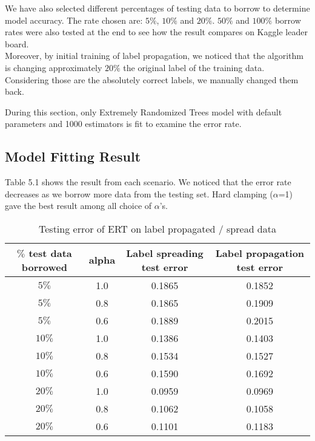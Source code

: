 \documentclass[11pt]{article}
\begin{document}
\noindent We have also selected different percentages of testing data to borrow to determine model accuracy. The rate chosen are: $5\%$, $10\%$ and $20\%$. $50\%$ and $100\%$ borrow rates were also tested at the end to see how the result compares on Kaggle leader board. \\

\noindent Moreover, by initial training of label propagation, we noticed that the algorithm is changing approximately $20\%$ the original label of the training data. Considering those are the absolutely correct labels, we manually changed them back.

\noindent During this section, only Extremely Randomized Trees model with default parameters and 1000 estimators is fit to examine the error rate. \\

\subsection{Model Fitting Result}

Table 5.1 shows the result from each scenario. We noticed that the error rate decreases as we borrow more data from the testing set. Hard clamping ($\alpha$=1) gave the best result among all choice of $\alpha$'s.

\begin{table}[ht]
    \label{semi_sub_result}
    \centering
    \begin{small}
    \begin{tabular}{c c|c|c}
        \hline
        \textbf{$\%$ test data borrowed} & \textbf{alpha} & \textbf{Label spreading test error} & \textbf{Label propagation test error} \\ \hline
        $5\%$ & 1.0 & 0.1865 & 0.1852 \\
        $5\%$ & 0.8 & 0.1865 & 0.1909 \\
        $5\%$ & 0.6 & 0.1889 & 0.2015 \\
        $10\%$ & 1.0 & 0.1386 & 0.1403 \\
        $10\%$ & 0.8 & 0.1534 & 0.1527 \\
        $10\%$ & 0.6 & 0.1590 & 0.1692 \\
        $20\%$ & 1.0 & 0.0959 & 0.0969 \\
        $20\%$ & 0.8 & 0.1062 & 0.1058 \\
        $20\%$ & 0.6 & 0.1101 & 0.1183 \\
        \hline
    \end{tabular}
    \end{small}
    \caption{Testing error of ERT on label propagated / spread data}
\end{table}
\end{document}
